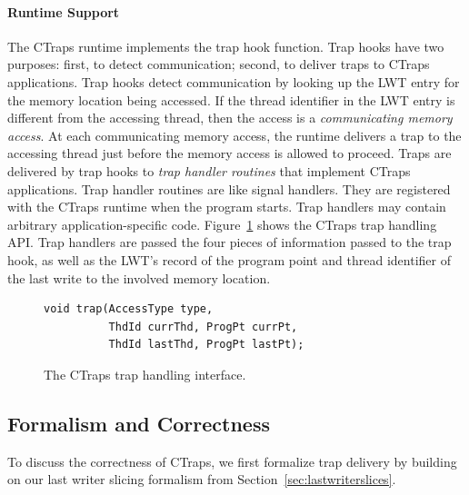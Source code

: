 \documentclass[preprint,9pt]{sigplanconf}
\newcommand{\ctraps}{CTraps\xspace}
\newcommand{\lwt}{LWT\xspace}
\begin{document}
\paragraph{Runtime Support}
The \ctraps runtime implements the trap hook function.  Trap hooks have two
purposes: first, to detect communication; second, to deliver traps to \ctraps
applications.  Trap hooks detect communication by looking up the \lwt entry for
the memory location being accessed.  If the thread identifier in the \lwt entry is
different from the accessing thread, then the access is a {\em communicating
memory access}.  At each communicating memory access, the runtime delivers a
trap to the accessing thread just before the memory access is allowed to
proceed.  Traps are delivered by trap hooks to {\em trap handler routines} that
implement \ctraps applications.  Trap handler routines are like signal
handlers.  They are registered with the \ctraps runtime when the program
starts.  Trap handlers may contain arbitrary application-specific code.
Figure~\ref{fig:hookapi} shows the \ctraps trap handling API.  Trap
handlers are passed the four pieces of information passed to the trap hook, as
well as the \lwt's record of the program point and thread identifier of the
last write to the involved memory location.

\begin{figure}[htb]
\centering
\begin{verbatim}
void trap(AccessType type, 
          ThdId currThd, ProgPt currPt,
          ThdId lastThd, ProgPt lastPt);
\end{verbatim}
\caption{\label{fig:hookapi}The \ctraps trap handling interface.}
\end{figure}

\subsection{Formalism and Correctness}
\label{sec:ctsoundness}
To discuss the correctness of \ctraps, we first formalize trap delivery by
building on our last writer slicing formalism from
Section~\ref{sec:lastwriterslices}.  
\end{document}
